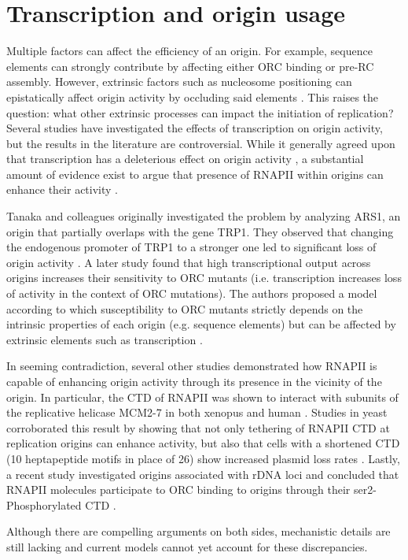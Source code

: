 \section{Transcription and origin usage}

Multiple factors can affect the efficiency of an origin.  
For example, sequence elements can strongly contribute by affecting either ORC binding or pre-RC assembly. 
However, extrinsic factors such as nucleosome positioning can epistatically affect origin activity by occluding said elements \cite{bodmerglavas:2001:rna}. 
This raises the question: what other extrinsic processes can impact the initiation of replication? Several studies have investigated the effects of transcription on origin activity, but the results in the literature are controversial. 
While it generally agreed upon that transcription has a deleterious effect on origin activity \cite{tanaka:1994:transcription,nieduszynski:2005:requirement}, a substantial amount of evidence exist to argue that presence of RNAPII within origins can enhance their activity \cite{yankulov:1999:mcm,gauthier:2002:role}. 


Tanaka and colleagues originally investigated the problem by analyzing ARS1, an origin that partially overlaps with the gene TRP1. 
They observed that changing the endogenous promoter of TRP1 to a stronger one led to significant loss of origin activity \cite{tanaka:1994:transcription}.
A later study found that high transcriptional output across origins increases their sensitivity to ORC mutants (i.e. transcription increases loss of activity in the context of ORC mutations). 
The authors proposed a model according to which susceptibility to ORC mutants strictly depends on the intrinsic properties of each origin (e.g. sequence elements) but can be affected by extrinsic elements such as transcription \cite{nieduszynski:2005:requirement}. 


In seeming contradiction, several other studies demonstrated how RNAPII is capable of enhancing origin activity through its presence in the vicinity of the origin. 
In particular, the CTD of RNAPII was shown to interact with subunits of the replicative helicase MCM2-7 in both xenopus and human \cite{yankulov:1999:mcm}. 
Studies in yeast corroborated this result by showing that not only tethering of RNAPII CTD at replication origins can enhance activity, but also that cells with a shortened CTD (10 heptapeptide motifs in place of 26) show increased plasmid loss rates \cite{gauthier:2002:role}. 
Lastly, a recent study investigated origins associated with rDNA loci and concluded that RNAPII molecules participate to ORC binding to origins through their  ser2-Phosphorylated CTD \cite{mayan:2013:rnapii}. 


Although there are compelling arguments on both sides, mechanistic details are still lacking and current models cannot yet account for these discrepancies.










